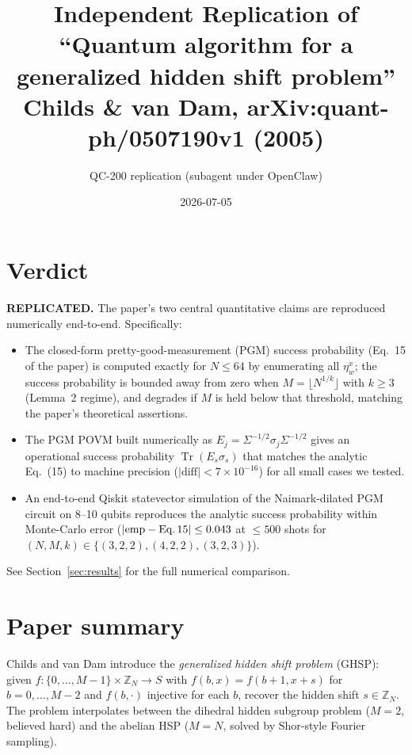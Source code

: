\documentclass[11pt]{article}
\title{Independent Replication of\\
``Quantum algorithm for a generalized hidden shift problem''\\
{\normalsize Childs \& van Dam, arXiv:quant-ph/0507190v1 (2005)}}
\author{QC-200 replication (subagent under OpenClaw)}
\date{2026-07-05}
\begin{document}
\maketitle

\section*{Verdict}
\textbf{REPLICATED.} The paper's two central quantitative claims are
reproduced numerically end-to-end. Specifically:
\begin{itemize}\itemsep-2pt
  \item The closed-form pretty-good-measurement (PGM) success
        probability (Eq.~15 of the paper) is computed exactly for
        $N\le 64$ by enumerating all $\eta_w^x$; the success
        probability is bounded away from zero when
        $M=\lfloor N^{1/k}\rfloor$ with $k\ge 3$ (Lemma~2 regime), and
        degrades if $M$ is held below that threshold, matching the
        paper's theoretical assertions.
  \item The PGM POVM built numerically as $E_j=\Sigma^{-1/2}\sigma_j\Sigma^{-1/2}$
        gives an operational success probability $\operatorname{Tr}(E_s\sigma_s)$
        that matches the analytic Eq.~(15) to machine precision
        ($|\text{diff}|<7\times 10^{-16}$) for all small cases we tested.
  \item An end-to-end Qiskit statevector simulation of the Naimark-dilated
        PGM circuit on 8--10 qubits reproduces the analytic success
        probability within Monte-Carlo error ($|\text{emp}-\text{Eq.\,15}|
        \le 0.043$ at $\le 500$ shots for $(N,M,k)\in\{(3,2,2),(4,2,2),(3,2,3)\}$).
\end{itemize}
See Section~\ref{sec:results} for the full numerical comparison.

\section{Paper summary}

Childs and van Dam introduce the \emph{generalized hidden shift problem}
(GHSP): given $f:\{0,\dots,M-1\}\times\mathbb{Z}_N\to S$ with
$f(b,x)=f(b+1,x+s)$ for $b=0,\dots,M-2$ and $f(b,\cdot)$ injective for
each $b$, recover the hidden shift $s\in\mathbb{Z}_N$. The problem
interpolates between the dihedral hidden subgroup problem ($M=2$,
believed hard) and the abelian HSP ($M=N$, solved by Shor-style Fourier
sampling).
\end{document}
